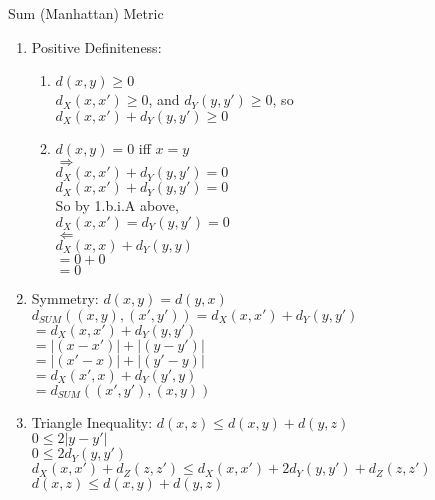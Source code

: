 \documentclass[12pt]{amsart}
\newcommand{\benu}{\begin{enumerate}}
\newcommand{\eenu}{\end{enumerate}}
\theoremstyle{definition}
\begin{document}
\begin{enumerate}[series=p]
	\eenu
	\item Sum (Manhattan) Metric
	\benu	
		\item Positive Definiteness:
		\benu
		\item $d(x,y) \geq 0$\\
		$d_X(x, x') \geq 0$, and $d_Y(y, y') \geq 0$, so\\ $d_X(x, x') + d_Y(y, y') \geq 0$
		\item $d(x,y) = 0$ iff $x = y$\\
		$\Rightarrow$\\
		$d_X(x, x') + d_Y(y, y') = 0$\\
		$d_X(x, x') + d_Y(y, y') = 0$\\
		So by 1.b.i.A above,\\
		$d_X(x, x') = d_Y(y, y') = 0$\\
		$\Leftarrow$\\
		$d_X(x,x) + d_Y(y,y)$\\
		$= 0 + 0$\\
		$ = 0$
		\eenu
		\item Symmetry: $d(x,y) = d(y,x)$\\
		$d_{SUM}((x,y),(x',y')) = d_X(x, x') + d_Y(y, y')$\\
		$= d_X(x, x') + d_Y(y, y')$\\
		$= |(x - x')| + |(y - y')|$\\
		$= |(x' - x)| + |(y' - y)|$\\
		$= d_X(x', x) + d_Y(y', y)$\\
		$ = d_{SUM}((x',y'),(x,y))$
		\item Triangle Inequality: $d(x,z) \leq d(x,y) + d(y,z)$\\
		$0 \leq 2|y - y'|$\\
		$0 \leq 2d_Y(y, y')$\\
		$d_X(x, x') + d_Z(z, z') \leq d_X(x, x') + 2d_Y(y, y') + d_Z(z, z')$\\
		$d(x,z) \leq d(x, y) + d(y,z)$
		

\end{enumerate}
\end{document}
